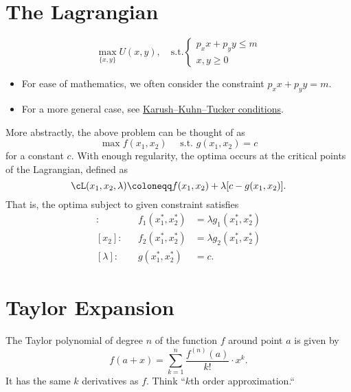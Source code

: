 \documentclass[oneside,reqno,letterpaper]{amsart}
\begin{document}
\section{The Lagrangian}
\begin{example}
  \[
    \max_{\{x, y\}} U(x, y), \quad \text{s.t.} 
    \begin{cases}
      p_x x + p_y y \leq m \\ 
      x, y \geq 0
    \end{cases}
  \]
  \begin{itemize}
    \item For ease of mathematics, we often consider the constraint \(p_x x + p_y y = m\). 
    \item For a more general case, see \href{https://en.wikipedia.org/wiki/Karush%E2%80%93Kuhn%E2%80%93Tucker_conditions}{Karush–Kuhn–Tucker conditions}. 
  \end{itemize}
\end{example}


\begin{theorem}
  More abstractly, the above problem can be thought of as 
  \[
    \max f(x_1, x_2) \quad \text{ s.t. } g(x_1, x_2) = c 
  \] 
  for a constant \(c\). 
  With enough regularity, the optima occurs at the critical points of the Lagrangian, defined as 
  \[
    \cL(x_1, x_2, \lambda)
    \coloneqq f(x_1, x_2) + \lambda [c - g(x_1, x_2)] . 
  \] 
  That is, the optima subject to given constraint satisfies 
  \begin{align*}
    [x_1]: && f_1(x_1^*, x_2^*) &= \lambda g_1(x_1^*, x_2^*) \\ 
    [x_2]: && f_2(x_1^*, x_2^*) &= \lambda g_2(x_1^*, x_2^*) \\ 
    [\lambda]: && g(x_1^*, x_2^*) &= c . 
  \end{align*}
\end{theorem}


\section{Taylor Expansion}
\begin{definition}
  The Taylor polynomial of degree \(n\) of the function \(f\) around point \(a\) is given by 
  \[
    f(a + x) = \sum_{k = 1}^{n} \frac{f^{(n)}(a)}{k!} \cdot x^{k} . 
  \] 
  It has the same \(k\) derivatives as \(f\). 
  Think ``\(k\)th order approximation.``
\end{definition}
\end{document}
